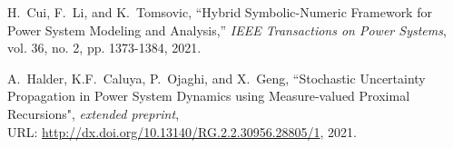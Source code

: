 \documentclass[10pt,twocolumn]{IEEEtran}
\begin{document}
\begin{thebibliography}{99}
H.~Cui, F.~Li, and K.~Tomsovic, ``Hybrid Symbolic-Numeric Framework for Power System Modeling and Analysis,'' \emph{IEEE Transactions on Power Systems}, vol. 36, no. 2, pp. 1373-1384, 2021.



A.~Halder, K.F.~Caluya, P.~Ojaghi, and X.~Geng, ``Stochastic Uncertainty Propagation in Power System Dynamics using Measure-valued Proximal Recursions", \emph{extended preprint}, \\
URL: \url{http://dx.doi.org/10.13140/RG.2.2.30956.28805/1}, 2021.
	
\end{thebibliography}

\end{document}
